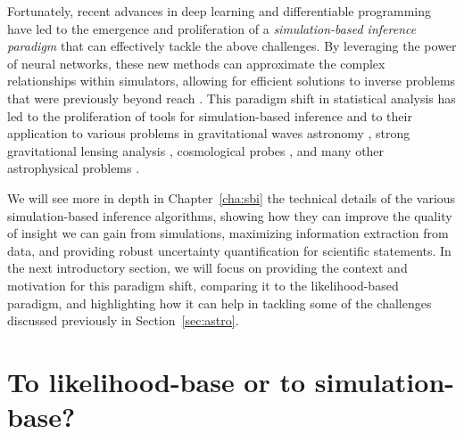 Fortunately, recent advances in deep learning \cite{lecun2015deep} and differentiable programming \cite{baydin2018automatic} have led to the emergence and proliferation of a \emph{simulation-based inference paradigm} that can effectively tackle the above challenges. By leveraging the power of neural networks, these new methods can approximate the complex relationships within simulators, allowing for efficient solutions to inverse problems that were previously beyond reach \cite{Cranmer:2019eaq}. This paradigm shift in statistical analysis has led to the proliferation of tools for simulation-based inference \cite[\eg][]{Alsing:2019xrx, tejero-cantero2020sbi, Miller2022, lampe} and to their application to various problems in gravitational waves astronomy \cite[\eg][]{Dax:2021tsq, Crisostomi:2023tle, kolmus2024tuning, Dimitriou:2023knw, Vilchez:2024qnw, Bhardwaj:2023xph, Alvey:2023naa, Alvey:2023npw}, strong gravitational lensing analysis \cite[\eg][]{Montel:2022fhv, Wagner-Carena:2020yun, Wagner-Carena:2022mrn, wagnercarena2024strong, Coogan:2022cky, Brehmer:2019jyt, Zhang:2022djp}, cosmological probes \cite[\eg][]{List:2023aa, Tucci:2023bag, Alsing:2019xrx, Modi:2023drt, Makinen:2021nly, DES:2024xij, Jeffrey:2020aa, vonWietersheim-Kramsta:2024cks, Cole:2021gwr, FrancoAbellan:2024tbj, Saxena:2023tue, Karchev:2022xyn, Karchev:2024stw}, and many other astrophysical problems \cite[\eg][]{AnauMontel:2022ppb, Barret:2024kvc, vasist2023neural, Hahn:2022nda, khullar2022digs, Mishra-Sharma:2021oxe, Christy:2024hou, Hermans:2020skz, albatross, Berteaud:2024zda, Mishra-Sharma:2021nhh}.

We will see more in depth in Chapter~\ref{cha:sbi} the technical details of the various simulation-based inference algorithms, showing how they can improve the quality of insight we can gain from simulations, maximizing information extraction from data, and providing robust uncertainty quantification for scientific statements. In the next introductory section, we will focus on providing the context and motivation for this paradigm shift, comparing it to the likelihood-based paradigm, and highlighting how it can help in tackling some of the challenges discussed previously in Section~\ref{sec:astro}.


\section{To likelihood-base or to simulation-base?}\label{sec:lbi-sbi}


